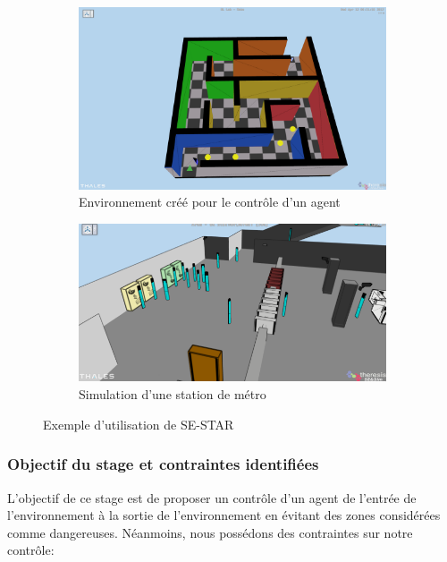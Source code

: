 \midskip
\begin{figure}[!h]
\centering
\begin{subfigure}{.5\textwidth}
  \centering
  \includegraphics[width=.9\linewidth]{./assets/SESTAR/env_sestar_color.png}
  \caption{Environnement créé pour le contrôle d'un agent}
  \label{fig:sub1}
\end{subfigure}%
\begin{subfigure}{.5\textwidth}
  \centering
  \includegraphics[width=.9\linewidth]{./assets/SESTAR/sestar_metro.png}
  \caption{Simulation d'une station de métro}
  \label{fig:sub2}
\end{subfigure}
\caption{Exemple d'utilisation de SE-STAR}
\label{fig:test}
\end{figure}

\subsubsection{Objectif du stage et contraintes identifiées}


L'objectif de ce stage est de proposer un contrôle d'un agent de l'entrée de l'environnement à la sortie de l'environnement en évitant des zones considérées comme dangereuses. Néanmoins, nous possédons des contraintes sur notre contrôle:     

